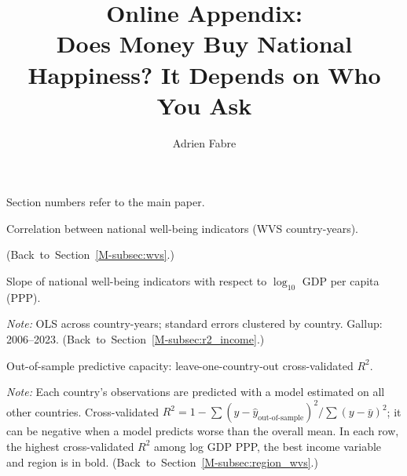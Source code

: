\documentclass[12pt]{article}
\title{Online Appendix:\\ Does Money Buy National Happiness? It Depends on Who You Ask}
\author{}
\author{Adrien Fabre}
\date{}
\begin{document}
\maketitle

\noindent Section numbers refer to the main paper.

\begin{table}[htbp]
    \centering
    \caption{Correlation between national well-being indicators (WVS country-years).}\label{tab:correlation}
    \begin{adjustbox}{max width=\textwidth}
    
    \end{adjustbox}
    \begin{minipage}{\textwidth}\footnotesize \hfill(Back~to~Section~\ref{M-subsec:wvs}.)\end{minipage}
\end{table}

\begin{table}[htbp]
    \centering
    \caption{Slope of national well-being indicators with respect to $\log_{10}$ GDP per capita (PPP).}\label{tab:slopes}
    \begin{adjustbox}{max width=\textwidth}
    
    \end{adjustbox}
    \begin{minipage}{\textwidth}\footnotesize \textit{Note:} OLS across country-years; standard errors clustered by country. Gallup: 2006--2023. \hfill(Back~to~Section~\ref{M-subsec:r2_income}.)\end{minipage}
\end{table}

\begin{table}[htbp]
    \centering
    \caption{Out-of-sample predictive capacity: leave-one-country-out cross-validated $R^2$.}\label{tab:cv}
    \begin{adjustbox}{max width=\textwidth}
    
    \end{adjustbox}
    \begin{minipage}{\textwidth}\footnotesize \textit{Note:} Each country's observations are predicted with a model estimated on all other countries. Cross-validated $R^2 = 1 - \sum (y - \hat y_{\text{out-of-sample}})^2 / \sum (y - \bar y)^2$; it can be negative when a model predicts worse than the overall mean. In each row, the highest cross-validated $R^2$ among log GDP PPP, the best income variable and region is in bold. \hfill(Back~to~Section~\ref{M-subsec:region_wvs}.)\end{minipage}
\end{table}
\end{document}

